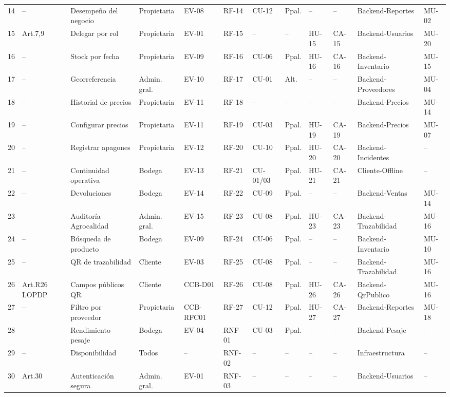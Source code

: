 \documentclass[11pt,a4paper]{article}
\begin{document}
\begin{longtable}{|p{0.3cm}|p{1.0cm}|p{1.9cm}|p{1.3cm}|p{0.6cm}|p{0.7cm}|p{0.6cm}|p{1.1cm}|p{0.6cm}|p{0.6cm}|p{2.0cm}|p{0.8cm}|}
14 & -- & Desempeño del negocio & Propietaria & EV-08 & RF-14 & CU-12 & Ppal. & -- & -- & Backend-Reportes & MU-02 \\
15 & Art.7,9 & Delegar por rol & Propietaria & EV-01 & RF-15 & -- & -- & HU-15 & CA-15 & Backend-Usuarios & MU-20 \\
16 & -- & Stock por fecha & Propietaria & EV-09 & RF-16 & CU-06 & Ppal. & HU-16 & CA-16 & Backend-Inventario & MU-15 \\
17 & -- & Georreferencia & Admin. gral. & EV-10 & RF-17 & CU-01 & Alt. & -- & -- & Backend-Proveedores & MU-04 \\
18 & -- & Historial de precios & Propietaria & EV-11 & RF-18 & -- & -- & -- & -- & Backend-Precios & MU-14 \\
19 & -- & Configurar precios & Propietaria & EV-11 & RF-19 & CU-03 & Ppal. & HU-19 & CA-19 & Backend-Precios & MU-07 \\
20 & -- & Registrar apagones & Propietaria & EV-12 & RF-20 & CU-10 & Ppal. & HU-20 & CA-20 & Backend-Incidentes & -- \\
21 & -- & Continuidad operativa & Bodega & EV-13 & RF-21 & CU-01/03 & Ppal. & HU-21 & CA-21 & Cliente-Offline & -- \\
22 & -- & Devoluciones & Bodega & EV-14 & RF-22 & CU-09 & Ppal. & -- & -- & Backend-Ventas & MU-14 \\
23 & -- & Auditoría Agrocalidad & Admin. gral. & EV-15 & RF-23 & CU-08 & Ppal. & HU-23 & CA-23 & Backend-Trazabilidad & MU-16 \\
24 & -- & Búsqueda de producto & Bodega & EV-09 & RF-24 & CU-06 & Ppal. & -- & -- & Backend-Inventario & MU-10 \\
25 & -- & QR de trazabilidad & Cliente & EV-03 & RF-25 & CU-08 & Ppal. & -- & -- & Backend-Trazabilidad & MU-16 \\
26 & Art.R26 LOPDP & Campos públicos QR & Cliente & CCB-D01 & RF-26 & CU-08 & Ppal. & HU-26 & CA-26 & Backend-QrPublico & MU-16 \\
27 & -- & Filtro por proveedor & Propietaria & CCB-RFC01 & RF-27 & CU-12 & Ppal. & HU-27 & CA-27 & Backend-Reportes & MU-18 \\
28 & -- & Rendimiento pesaje & Bodega & EV-04 & RNF-01 & CU-03 & Ppal. & -- & -- & Backend-Pesaje & -- \\
29 & -- & Disponibilidad & Todos & -- & RNF-02 & -- & -- & -- & -- & Infraestructura & -- \\
30 & Art.30 & Autenticación segura & Admin. gral. & EV-01 & RNF-03 & -- & -- & -- & -- & Backend-Usuarios & -- \\

\end{longtable}
\end{document}
